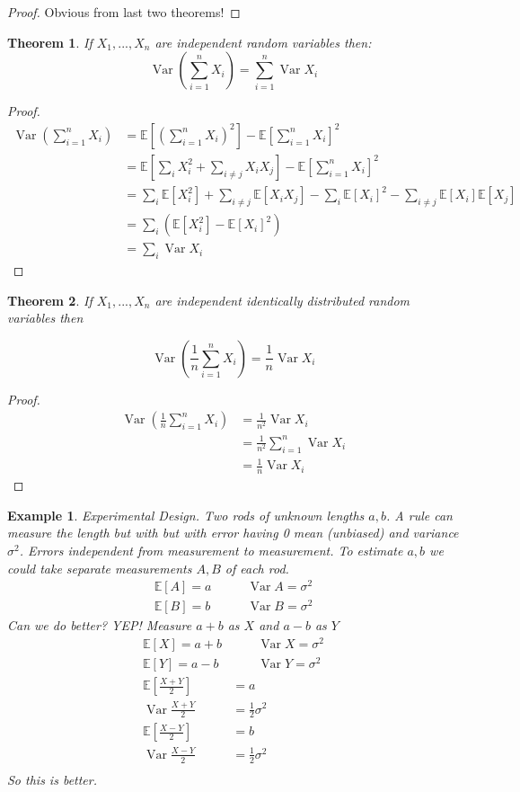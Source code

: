 \documentclass{notes}
\theoremstyle{plain}
\newtheorem{theorem}{Theorem}[chapter]
\newtheorem*{example}{Example}
\newcommand{\bE}{\mathbb{E}}
\newcommand{\expect}[1]{\bE\!\left[#1\right]}
\DeclareMathOperator{\var}{Var}
\begin{document}
\begin{proof}
Obvious from last two theorems!
\end{proof}
\begin{theorem}
If $X_1,...,X_n$ are independent random variables then:
\[
\var \left( \sum_{i=1}^n X_i \right) =  \sum_{i=1}^n \var X_i
\]
\end{theorem}
\begin{proof}
\begin{align*}
\var{ \left(\sum_{i=1}^n X_i \right)} &=\expect{\left(\sum_{i=1}^n X_i\right)^2} - \expect{\sum_{i=1}^n X_i}^2 \\
&= \expect{ \sum_i X_i^2 + \sum_{i \neq j} X_iX_j} - 
\expect{\sum_{i=1}^n X_i}^2\\
&= \sum_i \expect{X_i^2} + \sum_{i \neq j} \expect{X_i X_j} -
\sum_i \expect{X_i}^2 - \sum_{i \neq j} \expect{X_i}\expect{X_j}\\
&= \sum_i\left( \expect{X_i^2} - \expect{X_i}^2 \right)\\
&= \sum_i \var X_i
\end{align*}
\end{proof}
\begin{theorem}
If $X_1,...,X_n$ are independent identically distributed random variables then

\[
\var \left( \frac{1}{n} \sum_{i=1}^n X_i\right) = \frac{1}{n} \var X_i
\]
\end{theorem}
\begin{proof}
\begin{align*}
\var \left( \frac{1}{n} \sum_{i=1}^n X_i\right) &= \frac{1}{n^2} \var X_i\\
&= \frac{1}{n^2}\sum_{i=1}^n \var X_i\\
&= \frac{1}{n} \var X_i
\end{align*}
\end{proof}
\begin{example} Experimental Design. \hfill
Two rods of unknown lengths $a,b$. A rule can measure the length but with 
but with error having 0 mean (unbiased) and variance $\sigma^2$.  Errors 
independent from measurement to measurement.  To estimate $a,b$ we could take
separate measurements $A,B$ of each rod.
\begin{align*}
\expect{A} = a & \qquad \var A = \sigma^2\\
\expect{B} = b & \qquad \var B = \sigma^2
\end{align*}
Can we do better? YEP! Measure $a+b$ as $X$ and $a-b$ as $Y$
\begin{align*}
\expect{X} = a+b & \qquad \var X = \sigma^2\\
\expect{Y} = a-b & \qquad \var Y = \sigma^2\\
\expect{\frac{X+Y}{2}} &= a \\
\var {\frac{X+Y}{2}} &= \frac{1}{2}\sigma^2\\
\expect{\frac{X-Y}{2}} &= b \\
\var {\frac{X-Y}{2}} &= \frac{1}{2}\sigma^2\\
\end{align*}
So this is better.
\end{example}
\end{document}
